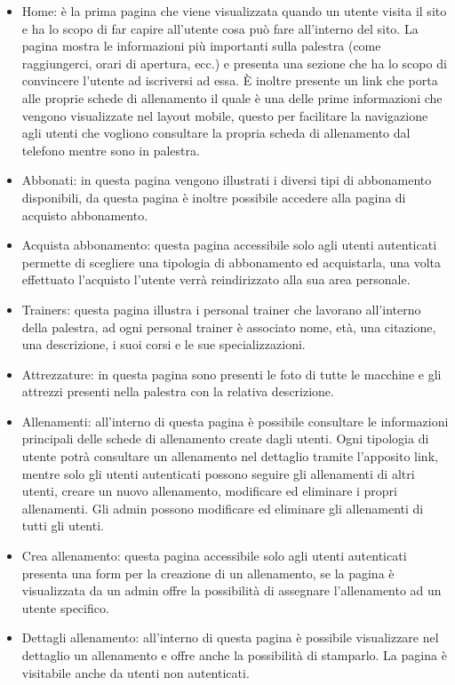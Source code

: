 \documentclass[a4paper]{article}
\begin{document}
    \begin{itemize}
        \item Home: è la prima pagina che viene visualizzata quando un utente visita il sito e ha lo scopo di far capire all’utente cosa può fare all’interno del sito. La pagina mostra le informazioni più importanti sulla palestra (come raggiungerci, orari di apertura, ecc.) e presenta una sezione che ha lo scopo di convincere l’utente ad iscriversi ad essa. È inoltre presente un link che porta alle proprie schede di allenamento il quale è una delle prime informazioni che vengono visualizzate nel layout mobile, questo per facilitare la navigazione agli utenti che vogliono consultare la propria scheda di allenamento dal telefono mentre sono in palestra.
        \item Abbonati: in questa pagina vengono illustrati i diversi tipi di abbonamento disponibili, da questa pagina è inoltre possibile accedere alla pagina di acquisto abbonamento.
        \item Acquista abbonamento: questa pagina accessibile solo agli utenti autenticati permette di scegliere una tipologia di abbonamento ed acquistarla, una volta effettuato l’acquisto l’utente verrà reindirizzato alla sua area personale.
        \item Trainers: questa pagina illustra i personal trainer che lavorano all’interno della palestra, ad ogni personal trainer è associato nome, età, una citazione, una descrizione, i suoi corsi e le sue specializzazioni.
        \item Attrezzature: in questa pagina sono presenti le foto di tutte le macchine e gli attrezzi presenti nella palestra con la relativa descrizione.
        \item Allenamenti: all’interno di questa pagina è possibile consultare le informazioni principali delle schede di allenamento create dagli utenti. Ogni tipologia di utente potrà consultare un allenamento nel dettaglio tramite l’apposito link, mentre solo gli utenti autenticati possono seguire gli allenamenti di altri utenti, creare un nuovo allenamento, modificare ed eliminare i propri allenamenti. Gli admin possono modificare ed eliminare gli allenamenti di tutti gli utenti.
        \item Crea allenamento: questa pagina accessibile solo agli utenti autenticati presenta una form per la creazione di un allenamento, se la pagina è visualizzata da un admin offre la possibilità di assegnare l’allenamento ad un utente specifico.
        \item Dettagli allenamento: all’interno di questa pagina è possibile visualizzare nel dettaglio un allenamento e offre anche la possibilità di stamparlo. La pagina è visitabile anche da utenti non autenticati.

\end{itemize}
\end{document}
